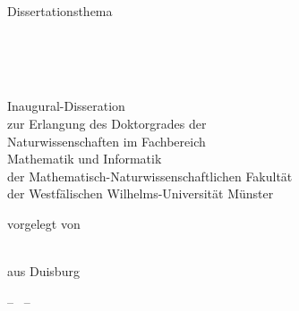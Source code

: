 
\begin{titlepage}

\begin{addmargin}[-1cm]{-3cm}
\begin{center}
\large

\hfill
\vfill

{\LARGE {}}

\vfill

Dissertationsthema

\vfill

\begingroup
  \huge \color{\titleColor}
  \begin{spacing}{1.5}
    \\
    \\
     \\
  \end{spacing}
\endgroup

\vfill

\begin{center}
  \begin{minipage}[t]{.85\textwidth}
    \centering
    \begin{spacing}{1.2}
    Inaugural-Disseration\\ zur Erlangung des Doktorgrades der\\
    Naturwissenschaften im Fachbereich\\ Mathematik und Informatik\\ der
    Mathematisch-Naturwissenschaftlichen Fakultät\\ der Westfälischen
    Wilhelms-Universität Münster
    \end{spacing}
  \end{minipage}
\end{center}

\vfill

vorgelegt von

\bigskip \bigskip

\spacedlowsmallcaps{\myName} \\ \medskip
aus Duisburg

\bigskip \bigskip

-- \myTime\ --

\vfill

\end{center}
\end{addmargin}

\end{titlepage}
